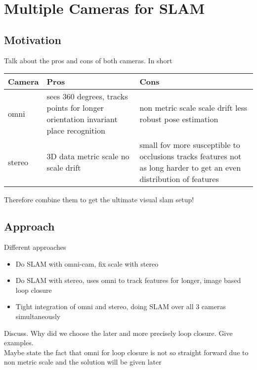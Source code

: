 \chapter{Multiple Cameras for SLAM}
\label{chapter:MultiCamSLAM}

\section{Motivation}

Talk about the pros and cons of both cameras.  In short

\begin{center}
 \begin{tabular}{ | l | p{5.5cm} | p{5.5cm} | }
  \hline
  \bf Camera & \bf Pros & \bf Cons \\ \hline
  omni 
  & sees 360 degrees, \newline 
  tracks points for longer \newline
  orientation invariant place recognition
  & non metric scale \newline 
  scale drift \newline less robust pose estimation\\ \hline
  
  stereo 
  & 3D data \newline metric scale \newline no scale drift
  & small fov \newline
  more susceptible to occlusions \newline 
  tracks features not as long \newline 
  harder to get an even distribution of features \\ \hline
 \end{tabular}

\end{center}


Therefore combine them to get the ultimate visual slam setup!

\section{Approach}

Different approaches
\begin{itemize}
 \item Do SLAM with omni-cam, fix scale with stereo
 \item Do SLAM with stereo, uses omni to track features for longer, image based loop closure
 \item Tight integration of omni and stereo, doing SLAM over all 3 cameras simultaneously 
\end{itemize}

Discuss.  Why did we choose the later and more precisely loop closure.
Give examples.
\\

Maybe state the fact that omni for loop closure is not so straight forward due to non metric scale and the solution will be given later